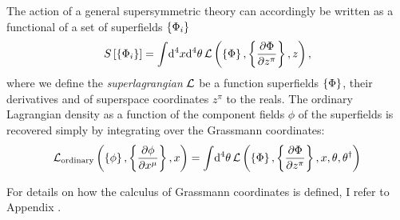 \documentclass[../main.tex]{subfiles}
\begin{document}
The action of a general supersymmetric theory can accordingly be written as a functional of a set of superfields \(\cclosed{\Phi_i}\)
\begin{equation}
  \label{susy:eq:susy_action}
  S\bclosed{\cclosed{\Phi_i}} = \integral{^4x \mathrm{d}^4\theta} \L\pclosed{\cclosed{\Phi}, \cclosed{\pd[z^\pi]{\Phi}}, z},
\end{equation}
where we define the \emph{superlagrangian} \(\L\) be a function superfields \(\cclosed{\Phi}\), their derivatives and of superspace coordinates \(z^\pi\) to the reals.
The ordinary Lagrangian density as a function of the component fields \(\phi\) of the superfields is recovered simply by integrating over the Grassmann coordinates:
\begin{equation}
  \L_\text{ordinary}\pclosed{\cclosed{\phi}, \cclosed{\pd[x^\mu]{\phi}}, x} = \integral{^4\theta} \L\pclosed{\cclosed{\Phi}, \cclosed{\pd[z^\pi]{\Phi}}, x, \theta, \theta^\dagger}
\end{equation}


For details on how the calculus of Grassmann coordinates is defined, I refer to Appendix \needcite.
\\
\end{document}
